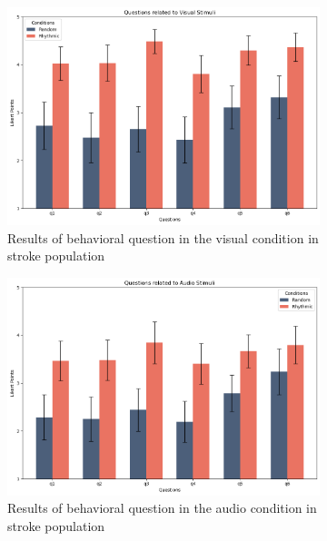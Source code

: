\begin{figure}[htbp]
    \begin{subfigure}[b]{0.5\textwidth}
        \centering
        \includegraphics[width=\textwidth]{bar_plots/plotbar_visual_s.png}
        \caption{Results of behavioral question in the visual condition in stroke population}
        \label{fig: bar_visual_stroke} 
    \end{subfigure} 
    \begin{subfigure}[b]{0.5\textwidth}
        \centering
        \includegraphics[width=\textwidth]{bar_plots/plotbar_audio_s.png}
        \caption{Results of behavioral question in the audio condition in stroke population}
        \label{fig: bar_audio_stroke} 
    \end{subfigure} 
    \begin{subfigure}[b]{0.5\textwidth}

\end{subfigure}
\end{figure}
